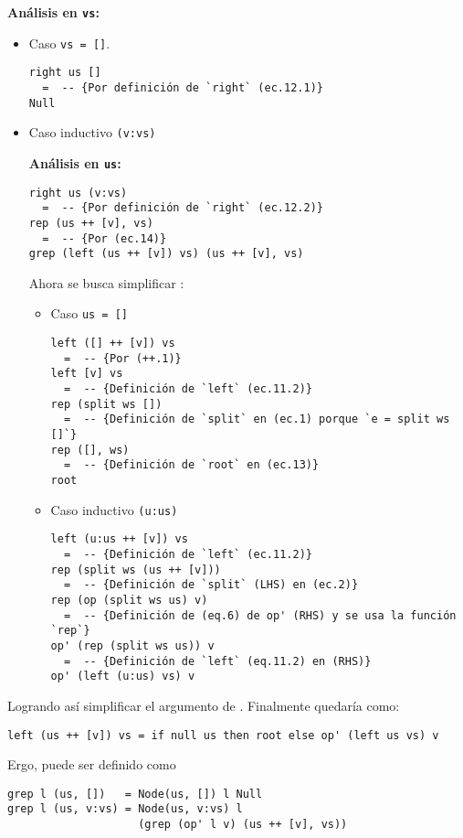 \textbf{Análisis en \texttt{vs}:}
\begin{itemize}
\item Caso \texttt{vs = []}.
\begin{verbatim}
right us []
  =  -- {Por definición de `right` (ec.12.1)}
Null
\end{verbatim}

\item Caso inductivo \texttt{(v:vs)}

\textbf{Análisis en \texttt{us}:}
\begin{verbatim}
right us (v:vs)
  =  -- {Por definición de `right` (ec.12.2)}
rep (us ++ [v], vs)
  =  -- {Por (ec.14)}
grep (left (us ++ [v]) vs) (us ++ [v], vs)
\end{verbatim}

Ahora se busca simplificar :
\begin{itemize}
\item Caso \texttt{us = []}
\begin{verbatim}
left ([] ++ [v]) vs
  =  -- {Por (++.1)}
left [v] vs
  =  -- {Definición de `left` (ec.11.2)}
rep (split ws []) 
  =  -- {Definición de `split` en (ec.1) porque `e = split ws []`}
rep ([], ws)
  =  -- {Definición de `root` en (ec.13)}
root
\end{verbatim}

\item Caso inductivo \texttt{(u:us)}
\begin{verbatim}
left (u:us ++ [v]) vs
  =  -- {Definición de `left` (ec.11.2)}
rep (split ws (us ++ [v]))
  =  -- {Definición de `split` (LHS) en (ec.2)}
rep (op (split ws us) v)
  =  -- {Definición de (eq.6) de op' (RHS) y se usa la función `rep`}
op' (rep (split ws us)) v
  =  -- {Definición de `left` (eq.11.2) en (RHS)}
op' (left (u:us) vs) v
\end{verbatim}

\end{itemize}
\end{itemize}

Logrando así simplificar el argumento de . Finalmente quedaría  como:
\begin{verbatim}
left (us ++ [v]) vs = if null us then root else op' (left us vs) v
\end{verbatim}

Ergo,  puede ser definido como
\begin{verbatim}
grep l (us, [])   = Node(us, []) l Null
grep l (us, v:vs) = Node(us, v:vs) l
                    (grep (op' l v) (us ++ [v], vs))
\end{verbatim}

